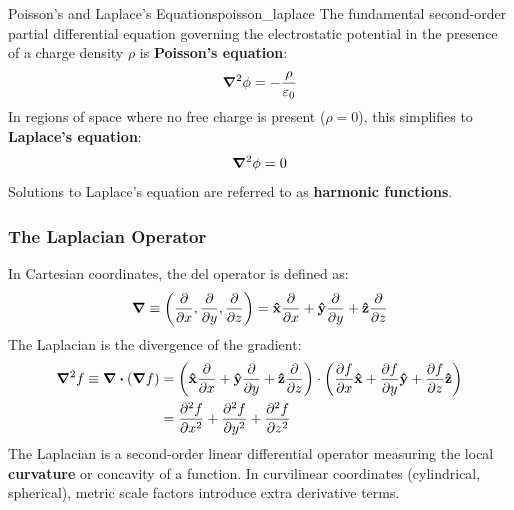 \begin{definition}{Poisson's and Laplace's Equations}{poisson_laplace}
The fundamental second-order partial differential equation governing the electrostatic potential in the presence of a charge density $\rho$ is \textbf{Poisson's equation}:
\begin{equation}
    \grad^2\phi = -\frac{\rho}{\varepsilon_0}
\end{equation}
In regions of space where no free charge is present ($\rho = 0$), this simplifies to \textbf{Laplace's equation}:
\begin{equation}
    \grad^2\phi = 0
\end{equation}
Solutions to Laplace's equation are referred to as \textbf{harmonic functions}.
\end{definition}

\subsubsection*{The Laplacian Operator}

In Cartesian coordinates, the del operator is defined as:
\begin{equation}
    \grad \equiv \left(\pdv{x}, \pdv{y}, \pdv{z}\right) = \vu{x}\pdv{x} + \vu{y}\pdv{y} + \vu{z}\pdv{z}
\end{equation}
The Laplacian is the divergence of the gradient:
\begin{align}
    \grad^2 f \equiv \div(\grad f) &= \left(\vu{x}\pdv{x} + \vu{y}\pdv{y} + \vu{z}\pdv{z}\right) \cdot \left(\pdv{f}{x}\vu{x} + \pdv{f}{y}\vu{y} + \pdv{f}{z}\vu{z}\right) \nonumber \\
    &= \pdv[2]{f}{x} + \pdv[2]{f}{y} + \pdv[2]{f}{z}
\end{align}
The Laplacian is a second-order linear differential operator measuring the local \textbf{curvature} or concavity of a function. In curvilinear coordinates (cylindrical, spherical), metric scale factors introduce extra derivative terms.

